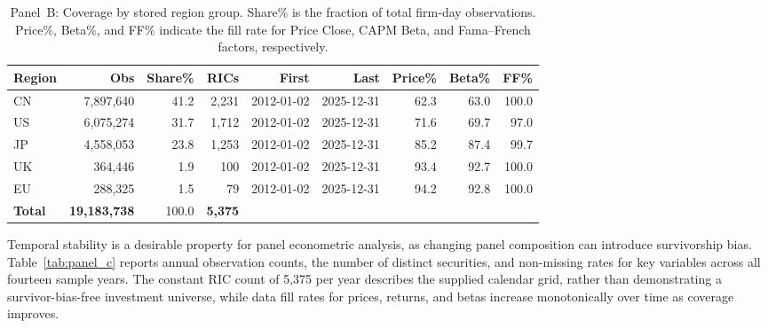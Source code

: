 \documentclass{article}
\theoremstyle{plain}
\begin{document}
\begin{table}[!ht]
\centering
\footnotesize
\begin{tabular}{l r r r r r r r r}
\toprule
\textbf{Region} & \textbf{Obs} & \textbf{Share\%} & \textbf{RICs} & \textbf{First} & \textbf{Last} & \textbf{Price\%} & \textbf{Beta\%} & \textbf{FF\%} \\
\midrule
  CN & 7,897,640 & 41.2 & 2,231 & 2012-01-02 & 2025-12-31 & 62.3 & 63.0 & 100.0 \\
  US & 6,075,274 & 31.7 & 1,712 & 2012-01-02 & 2025-12-31 & 71.6 & 69.7 & 97.0 \\
  JP & 4,558,053 & 23.8 & 1,253 & 2012-01-02 & 2025-12-31 & 85.2 & 87.4 & 99.7 \\
  UK & 364,446 & 1.9 & 100 & 2012-01-02 & 2025-12-31 & 93.4 & 92.7 & 100.0 \\
  EU & 288,325 & 1.5 & 79 & 2012-01-02 & 2025-12-31 & 94.2 & 92.8 & 100.0 \\
\midrule
  \textbf{Total} & \textbf{19,183,738} & 100.0 & \textbf{5,375} & & & & & \\
\bottomrule
\end{tabular}
\caption{Panel~B: Coverage by stored region group. Share\% is the fraction of total firm-day observations. Price\%, Beta\%, and FF\% indicate the fill rate for Price Close, CAPM Beta, and Fama--French factors, respectively.}
\label{tab:panel_b}
\end{table}

Temporal stability is a desirable property for panel econometric analysis, as changing panel composition can introduce survivorship bias. Table~\ref{tab:panel_c} reports annual observation counts, the number of distinct securities, and non-missing rates for key variables across all fourteen sample years. The constant RIC count of 5,375 per year describes the supplied calendar grid, rather than demonstrating a survivor-bias-free investment universe, while data fill rates for prices, returns, and betas increase monotonically over time as coverage improves.
\end{document}

